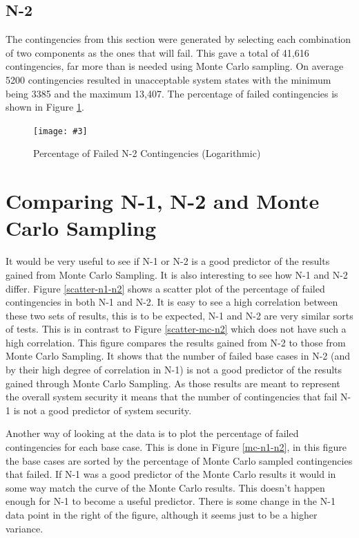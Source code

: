 \documentclass[a4paper,oneside,12pt]{report}
\newcommand{\image}[3] {
  \begin{figure}
    \begin{center}
      \texttt{[image: \#3]}
      \caption{#2}
      \label{#1}
    \end{center}
  \end{figure}
}
\begin{document}
\subsection{N-2}

The contingencies from this section were generated by selecting each combination of two components as the ones that will fail. This gave a total of 41,616 contingencies, far more than is needed using Monte Carlo sampling. On average 5200 contingencies resulted in unacceptable system states with the minimum being 3385 and the maximum 13,407. The percentage of failed contingencies is shown in Figure \ref{nx2logunacceptable}. 

\image{nx2logunacceptable}{Percentage of Failed N-2 Contingencies (Logarithmic)}{nx2logunacceptable.png}

\section{Comparing N-1, N-2 and Monte Carlo Sampling}

It would be very useful to see if N-1 or N-2 is a good predictor of the results gained from Monte Carlo Sampling. It is also interesting to see how N-1 and N-2 differ. Figure \ref{scatter-n1-n2} shows a scatter plot of the percentage of failed contingencies in both N-1 and N-2. It is easy to see a high correlation between these two sets of results, this is to be expected, N-1 and N-2 are very similar sorts of tests. This is in contrast to Figure \ref{scatter-mc-n2} which does not have such a high correlation. This figure compares the results gained from N-2 to those from Monte Carlo Sampling. It shows that the number of failed base cases in N-2 (and by their high degree of correlation in N-1) is not a good predictor of the results gained through Monte Carlo Sampling. As those results are meant to represent the overall system security it means that the number of contingencies that fail N-1 is not a good predictor of system security. 

Another way of looking at the data is to plot the percentage of failed contingencies for each base case. This is done in Figure \ref{mc-n1-n2}, in this figure the base cases are sorted by the percentage of Monte Carlo sampled contingencies that failed. If N-1 was a good predictor of the Monte Carlo results it would in some way match the curve of the Monte Carlo results. This doesn't happen enough for N-1 to become a useful predictor. There is some change in the N-1 data point in the right of the figure, although it seems just to be a higher variance.
\end{document}

